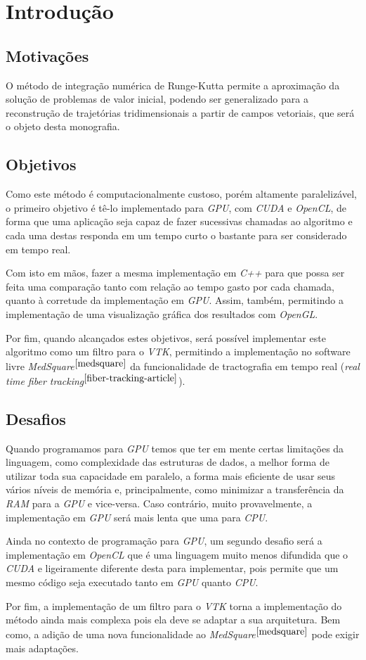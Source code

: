 \chapter{Introdução}

\section{Motivações}
O método de integração numérica de Runge-Kutta permite a aproximação da solução de problemas de valor inicial, podendo ser generalizado para a reconstrução de trajetórias tridimensionais a partir de campos vetoriais, que será o objeto desta monografia.

\section{Objetivos}
Como este método é computacionalmente custoso, porém altamente paralelizável, o primeiro objetivo é tê-lo implementado para \textit{GPU}, com \textit{CUDA} e \textit{OpenCL}, de forma que uma aplicação seja capaz de fazer sucessivas chamadas ao algoritmo e cada uma destas responda em um tempo curto o bastante para ser considerado em tempo real.

Com isto em mãos, fazer a mesma implementação em \textit{C++} para que possa ser feita uma comparação tanto com relação ao tempo gasto por cada chamada, quanto à corretude da implementação em \textit{GPU}. Assim, também, permitindo a implementação de uma visualização gráfica dos resultados com \textit{OpenGL}.

Por fim, quando alcançados estes objetivos, será possível implementar este algoritmo como um filtro para o \textit{VTK}, permitindo a implementação no software livre \textit{MedSquare}$^{\ref{medsquare}}$ da funcionalidade de tractografia em tempo real (\textit{real time fiber tracking}$^{\ref{fiber-tracking-article}}$).

\newpage
\section{Desafios}
Quando programamos para \textit{GPU} temos que ter em mente certas limitações da linguagem, como complexidade das estruturas de dados, a melhor forma de utilizar toda sua capacidade em paralelo, a forma mais eficiente de usar seus vários níveis de memória e, principalmente, como minimizar a transferência da \textit{RAM} para a \textit{GPU} e vice-versa. Caso contrário, muito provavelmente, a implementação em \textit{GPU} será mais lenta que uma para \textit{CPU}.

Ainda no contexto de programação para \textit{GPU}, um segundo desafio será a implementação em \textit{OpenCL} que é uma linguagem muito menos difundida que o \textit{CUDA} e ligeiramente diferente desta para implementar, pois permite que um mesmo código seja executado tanto em \textit{GPU} quanto \textit{CPU}.

Por fim, a implementação de um filtro para o \textit{VTK} torna a implementação do método ainda mais complexa pois ela deve se adaptar a sua arquitetura. Bem como, a adição de uma nova funcionalidade ao \textit{MedSquare}$^{\ref{medsquare}}$ pode exigir mais adaptações.
